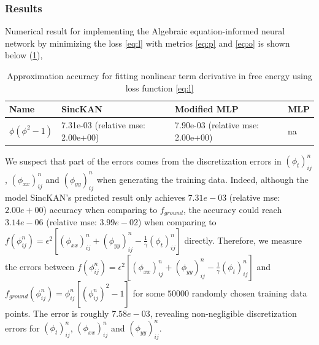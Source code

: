 \subsubsection{Results}
Numerical result for implementing the Algebraic equation-informed neural network by minimizing the loss \eqref{eq:l} with metrics \eqref{eq:p} and \eqref{eq:o} is shown below (\cref{tab:free energy derivative2}),
\begin{table}[H]
    \centering
    \begin{tabular}{|l|l|l|l|}
         \hline Name&  SincKAN&  Modified MLP& MLP\\
         \hline $\phi ( \phi^2 - 1)$ &  7.31e-03 (relative mse: 2.00e+00)&  7.90e-03 (relative mse: 2.00e+00)& na\\
         \hline
    \end{tabular}
    \caption{Approximation accuracy for fitting nonlinear term derivative in free energy using loss function \eqref{eq:l}}
    \label{tab:free energy derivative2}
\end{table}
We suspect that part of the errors comes from the discretization errors in $(\phi_t)^{n}_{ij}$, $(\phi_{xx})^{n}_{ij}$ and $(\phi_{yy})^{n}_{ij}$ when generating the training data. Indeed, although the model SincKAN's predicted result only achieves $7.31e-03$ (relative mse: $2.00e+00$) accuracy when comparing to $f_{ground}$, the accuracy could reach $3.14e-06$ (relative mse: $3.99e-02$) when comparing to $f( \phi^{n}_{ij} ) = \epsilon^2 [(\phi_{xx})^{n}_{ij} + (\phi_{yy})^{n}_{ij} - \frac{1}{\gamma} (\phi_t)^{n}_{ij}]$ directly.  Therefore, we measure the errors between $f( \phi^{n}_{ij} ) = \epsilon^2 [(\phi_{xx})^{n}_{ij} + (\phi_{yy})^{n}_{ij} - \frac{1}{\gamma} (\phi_t)^{n}_{ij}]$ and \( f_{ground}( \phi^{n}_{ij} ) =  \phi^{n}_{ij} [(\phi^{n}_{ij})^{2} - 1] \) for some $50000$ randomly chosen training data points. The error is roughly $7.58e-03$, revealing non-negligible discretization errors for $(\phi_t)^{n}_{ij}$, $(\phi_{xx})^{n}_{ij}$ and $(\phi_{yy})^{n}_{ij}$.

